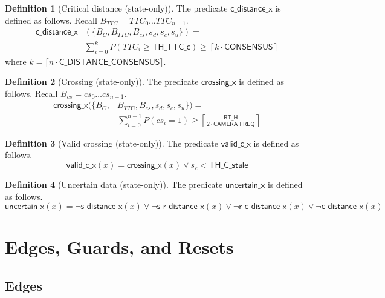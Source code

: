 \documentclass[12pt]{article}
\theoremstyle{definition}
\newtheorem{definition}{Definition}[section]
\begin{document}
\begin{definition}[Critical distance (state-only)]
The predicate $\mathsf{c\_distance\_x}$ is defined as follows. Recall $B_{TTC} = TTC_0 \ldots TTC_{n-1}$.
\[
    \begin{aligned}
        \mathsf{c\_distance\_x}&(\{B_C, B_{TTC}, B_{cs}, s_d, s_c, s_u\}) = \\
        &\sum_{i=0}^{k} P(TTC_i \geq \mathsf{TH\_TTC\_c}) \geq 
        \left\lceil k \cdot \mathsf{CONSENSUS}\right\rceil
    \end{aligned}
\]
where $k = \lceil n \cdot \mathsf{C\_DISTANCE\_CONSENSUS} \rceil$.    
\end{definition}

\begin{definition}[Crossing (state-only)]
    The predicate $\mathsf{crossing\_x}$ is defined as follows. Recall $B_{cs} = cs_0 \ldots cs_{n-1}$.
    \[
        \begin{aligned}
            \mathsf{crossing\_x}(\{B_C, &B_{TTC}, B_{cs}, s_d, s_c, s_u\}) = \\ 
            &\sum_{i=0}^{n-1} P(cs_i = 1) \geq 
            \left\lceil \frac{\mathsf{RT\_H}}{ 2 \cdot \mathsf{CAMERA\_FREQ}} \right\rceil
        \end{aligned}
    \]
\end{definition}

\begin{definition}[Valid crossing (state-only)]
    The predicate $\mathsf{valid\_c\_x}$ is defined as follows.
    \[
        \mathsf{valid\_c\_x}(x) = \mathsf{crossing\_x}(x) \lor s_c < \mathsf{TH\_C\_stale}
    \]
\end{definition}

\begin{definition}[Uncertain data (state-only)]
    The predicate $\mathsf{uncertain\_x}$ is defined as follows.
    \[
        \mathsf{uncertain\_x}(x) = 
        \neg \mathsf{s\_distance\_x}(x) \lor 
        \neg \mathsf{s\_r\_distance\_x}(x) \lor 
        \neg \mathsf{r\_c\_distance\_x}(x) \lor 
        \neg \mathsf{c\_distance\_x}(x)
    \]
\end{definition}



\section{Edges, Guards, and Resets}

\subsection{Edges}
\end{document}
